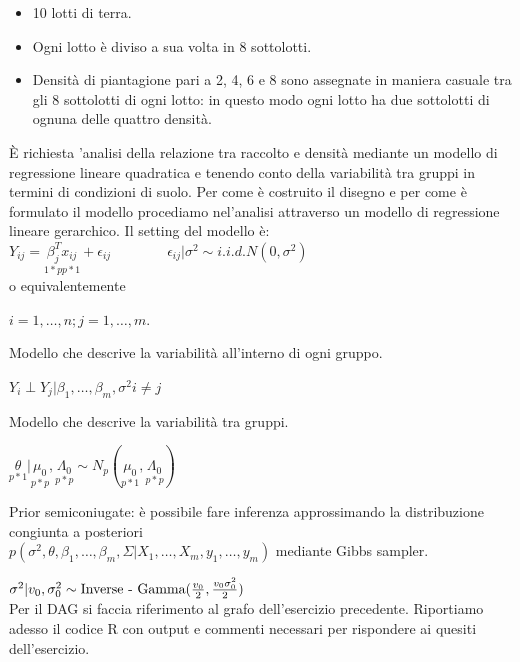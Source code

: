 \begin{itemize}
    \item 10 lotti di terra.
    \item Ogni lotto è diviso a sua volta in 8 sottolotti.
    \item Densità di piantagione pari a 2, 4, 6 e 8 sono assegnate in maniera casuale tra
    gli 8 sottolotti di ogni lotto: in questo modo ogni lotto ha due sottolotti di ognuna delle quattro densità.
\end{itemize}

È richiesta 'analisi della relazione tra raccolto e densità mediante un modello di regressione
lineare quadratica e tenendo conto della variabilità tra gruppi in termini di condizioni di suolo.
Per come è costruito il disegno e per come è formulato il modello procediamo nel'analisi attraverso
un modello di regressione lineare gerarchico. Il setting del modello è:\\
$ Y_{ij} = \underset{1*p p * 1}{\beta^T_jx_{ij}} + \epsilon_{ij} \qquad \qquad \epsilon_{ij}|\sigma^2 \sim i.i.d. N(0,\sigma^2)$
\\
o equivalentemente 
\begin{description}[leftmargin=6.8cm]
    \item [$ \underset{n_j *1}{Y_j} | \underset{p * 1}{\beta_j}, \underset{n_j * p}X_j, \sigma^2 \sim N_{n_j} (\underset{n_j*p p*1}{X_j \beta_j}, \sigma^2 \underset{n_j nj}{I})$]
    $i = 1, \dots, n; j = 1, \dots, m.$ 

    Modello che descrive la variabilità all'interno di ogni gruppo.
\end{description}
$ Y_i \perp Y_j | \beta_1, \dots, \beta_m, \sigma^2 i \neq j$ \\
\begin{description}[leftmargin=5cm]
    \item [$ \underset{p *1}{\beta_j} | \underset{p * 1}{\theta}, \underset{p * p}\Sigma \sim i.i.d. N_{p} (\underset{p*1}{\theta}, \underset{p *p }{\Sigma})$]
    Modello che descrive la variabilità tra gruppi.
\end{description}
$ \underset{p *1}{\theta} | \underset{p * p}{\mu_0}, \underset{p * p}{\Lambda_0} \sim N_p(\underset{p*1}{\mu_0}, \underset{p * p}{\Lambda_0}) $
\begin{description}[leftmargin=6.2cm]
    \item [$ \underset{p * p}{\Sigma} \sim \text{\normalfont{Inverse - Wishart}}(\eta_0, \underset{p*1}{S_0{-1}})$]
    Prior semiconiugate: è possibile fare inferenza approssimando la distribuzione congiunta a posteriori \\
    $p(\sigma^2, \theta,\beta_1, \dots, \beta_m, \Sigma|X_1, \dots, X_m, y_1,\dots, y_m)$
    mediante Gibbs sampler.
\end{description}
$ \sigma^2 | v_0, \sigma^2_0\sim \text{\normalfont{Inverse - Gamma}}(\frac{v_0}{2}, \frac{v_0\sigma^2_0}{2})$
\\
Per il DAG si faccia riferimento al grafo dell'esercizio precedente.
Riportiamo adesso il codice R con output e commenti necessari per rispondere ai quesiti dell'esercizio.

